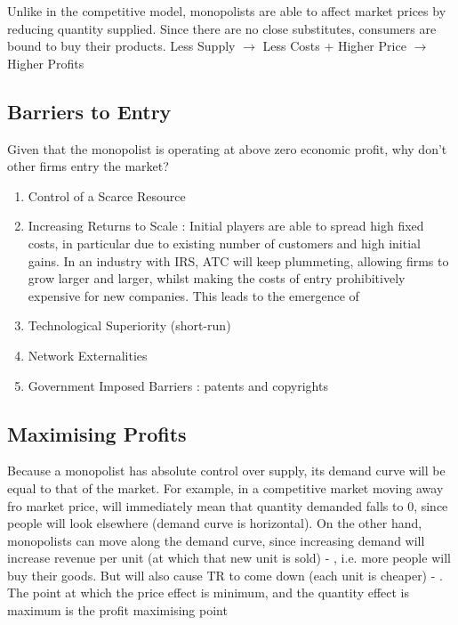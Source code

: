 \documentclass[english,course,draft]{Notes}
\begin{document}



\par{Unlike in the competitive model, monopolists are able to affect market prices by reducing quantity supplied. Since there are no close substitutes, consumers are bound to buy their products. Less Supply $\rightarrow$ Less Costs + Higher Price $\rightarrow$ Higher Profits}

\subsection{Barriers to Entry}

\par{Given that the monopolist is operating at above zero economic profit, why don't other firms entry the market?}

\begin{enumerate}
	\item Control of a Scarce Resource 
	\item Increasing Returns to Scale : Initial players are able to spread high fixed costs, in particular due to existing number of customers and high initial gains. In an industry with IRS, ATC will keep plummeting, allowing firms to grow larger and larger, whilst making the costs of entry prohibitively expensive for new companies. This leads to the emergence of 
	\item Technological Superiority (short-run)
	\item Network Externalities
	\item Government Imposed Barriers : patents and copyrights
\end{enumerate}

\subsection{Maximising Profits}

\par{Because a monopolist has absolute control over supply, its demand curve will be equal to that of the market. For example, in a competitive market moving away fro market price, will immediately mean that quantity demanded falls to $0$, since people will look elsewhere (demand curve is horizontal). On the other hand, monopolists can move along the demand curve, since increasing demand will increase revenue per unit (at which that new unit is sold) -  , i.e. more people will buy their goods. But will also cause TR to come down (each unit is cheaper) -  . The point at which the price effect is minimum, and the quantity effect is maximum is the profit maximising point}
\end{document}
